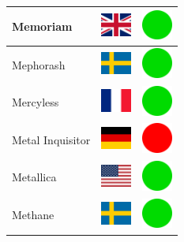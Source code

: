 \documentclass[12pt, a4paper, twoside]{report}
\begin{document}
\begin{center}
\begin{longtable}{|p{5cm}|p{2cm}|p{2cm}|}
 Memoriam                                                   & \includegraphics[width=1cm]{../4x3/gb} &   \includegraphics[width=1cm]{../likes/y} \\ \hline
 Mephorash                                                  & \includegraphics[width=1cm]{../4x3/se} &   \includegraphics[width=1cm]{../likes/y} \\ \hline
 Mercyless                                                  & \includegraphics[width=1cm]{../4x3/fr} &   \includegraphics[width=1cm]{../likes/y} \\ \hline
 Metal Inquisitor                                           & \includegraphics[width=1cm]{../4x3/de} &   \includegraphics[width=1cm]{../likes/n} \\ \hline
 Metallica                                                  & \includegraphics[width=1cm]{../4x3/us} &   \includegraphics[width=1cm]{../likes/y} \\ \hline
 Methane                                                    & \includegraphics[width=1cm]{../4x3/se} &   \includegraphics[width=1cm]{../likes/y} \\ \hline

\end{longtable}
\end{center}
\end{document}
